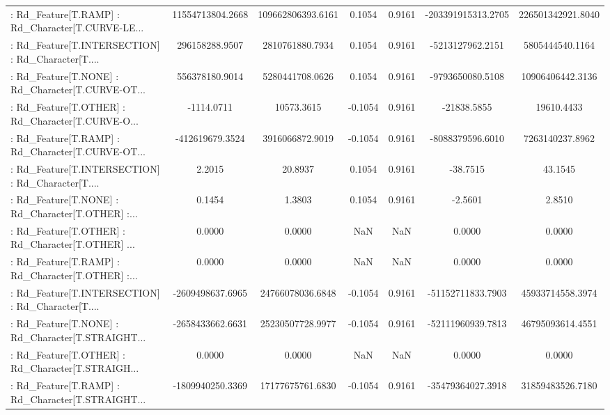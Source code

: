 \begin{longtable}{p{4cm}cccccc}
 : Rd\_Feature[T.RAMP] : Rd\_Character[T.CURVE-LE... &  11554713804.2668 & 109662806393.6161 &  0.1054 &       0.9161 & -203391915313.2705 & 226501342921.8040 \\
 : Rd\_Feature[T.INTERSECTION] : Rd\_Character[T.... &    296158288.9507 &   2810761880.7934 &  0.1054 &       0.9161 &   -5213127962.2151 &   5805444540.1164 \\
 : Rd\_Feature[T.NONE] : Rd\_Character[T.CURVE-OT... &    556378180.9014 &   5280441708.0626 &  0.1054 &       0.9161 &   -9793650080.5108 &  10906406442.3136 \\
 : Rd\_Feature[T.OTHER] : Rd\_Character[T.CURVE-O... &        -1114.0711 &        10573.3615 & -0.1054 &       0.9161 &        -21838.5855 &        19610.4433 \\
 : Rd\_Feature[T.RAMP] : Rd\_Character[T.CURVE-OT... &   -412619679.3524 &   3916066872.9019 & -0.1054 &       0.9161 &   -8088379596.6010 &   7263140237.8962 \\
 : Rd\_Feature[T.INTERSECTION] : Rd\_Character[T.... &            2.2015 &           20.8937 &  0.1054 &       0.9161 &           -38.7515 &           43.1545 \\
 : Rd\_Feature[T.NONE] : Rd\_Character[T.OTHER] :... &            0.1454 &            1.3803 &  0.1054 &       0.9161 &            -2.5601 &            2.8510 \\
 : Rd\_Feature[T.OTHER] : Rd\_Character[T.OTHER] ... &            0.0000 &            0.0000 &     NaN &          NaN &             0.0000 &            0.0000 \\
 : Rd\_Feature[T.RAMP] : Rd\_Character[T.OTHER] :... &            0.0000 &            0.0000 &     NaN &          NaN &             0.0000 &            0.0000 \\
 : Rd\_Feature[T.INTERSECTION] : Rd\_Character[T.... &  -2609498637.6965 &  24766078036.6848 & -0.1054 &       0.9161 &  -51152711833.7903 &  45933714558.3974 \\
 : Rd\_Feature[T.NONE] : Rd\_Character[T.STRAIGHT... &  -2658433662.6631 &  25230507728.9977 & -0.1054 &       0.9161 &  -52111960939.7813 &  46795093614.4551 \\
 : Rd\_Feature[T.OTHER] : Rd\_Character[T.STRAIGH... &            0.0000 &            0.0000 &     NaN &          NaN &             0.0000 &            0.0000 \\
 : Rd\_Feature[T.RAMP] : Rd\_Character[T.STRAIGHT... &  -1809940250.3369 &  17177675761.6830 & -0.1054 &       0.9161 &  -35479364027.3918 &  31859483526.7180 \\

\end{longtable}
